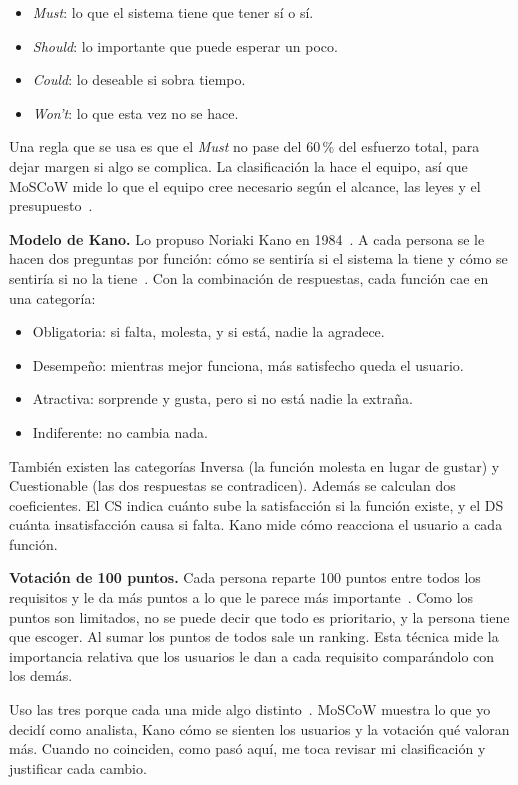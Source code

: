 \documentclass[11pt,a4paper]{article}
\begin{document}
\begin{itemize}
\item \emph{Must}: lo que el sistema tiene que tener sí o sí.
\item \emph{Should}: lo importante que puede esperar un poco.
\item \emph{Could}: lo deseable si sobra tiempo.
\item \emph{Won't}: lo que esta vez no se hace.
\end{itemize}

Una regla que se usa es que el \emph{Must} no pase del 60\,\% del esfuerzo total, para dejar margen si algo se complica. La clasificación la hace el equipo, así que MoSCoW mide lo que el equipo cree necesario según el alcance, las leyes y el presupuesto~\cite{wiegers2013}.

\textbf{Modelo de Kano.} Lo propuso Noriaki Kano en 1984~\cite{kano1984}. A cada persona se le hacen dos preguntas por función: cómo se sentiría si el sistema la tiene y cómo se sentiría si no la tiene~\cite{binder2023}. Con la combinación de respuestas, cada función cae en una categoría:

\begin{itemize}
\item Obligatoria: si falta, molesta, y si está, nadie la agradece.
\item Desempeño: mientras mejor funciona, más satisfecho queda el usuario.
\item Atractiva: sorprende y gusta, pero si no está nadie la extraña.
\item Indiferente: no cambia nada.
\end{itemize}

También existen las categorías Inversa (la función molesta en lugar de gustar) y Cuestionable (las dos respuestas se contradicen). Además se calculan dos coeficientes. El CS indica cuánto sube la satisfacción si la función existe, y el DS cuánta insatisfacción causa si falta. Kano mide cómo reacciona el usuario a cada función.

\textbf{Votación de 100 puntos.} Cada persona reparte 100 puntos entre todos los requisitos y le da más puntos a lo que le parece más importante~\cite{wiegers2013}. Como los puntos son limitados, no se puede decir que todo es prioritario, y la persona tiene que escoger. Al sumar los puntos de todos sale un ranking. Esta técnica mide la importancia relativa que los usuarios le dan a cada requisito comparándolo con los demás.

Uso las tres porque cada una mide algo distinto~\cite{yaseen2023,alsafadi2026}. MoSCoW muestra lo que yo decidí como analista, Kano cómo se sienten los usuarios y la votación qué valoran más. Cuando no coinciden, como pasó aquí, me toca revisar mi clasificación y justificar cada cambio.
\end{document}
